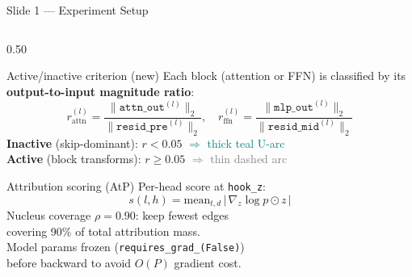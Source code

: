 \documentclass[aspectratio=169,10pt]{beamer}
\begin{document}
\begin{frame}{Slide 1 — Experiment Setup}
\begin{columns}[T]
\begin{column}{0.50\textwidth}
\begin{block}{Active/inactive criterion (new)}
\footnotesize
Each block (attention or FFN) is classified by its\\
\textbf{output-to-input magnitude ratio}:
\[
r_{\text{attn}}^{(l)} = \frac{\|\mathtt{attn\_out}^{(l)}\|_2}{\|\mathtt{resid\_pre}^{(l)}\|_2},
\quad
r_{\text{ffn}}^{(l)} = \frac{\|\mathtt{mlp\_out}^{(l)}\|_2}{\|\mathtt{resid\_mid}^{(l)}\|_2}
\]
\textbf{Inactive} (skip-dominant): $r < 0.05$ \quad
\textcolor{teal}{$\boldsymbol{\Rightarrow}$ thick teal U-arc}\\
\textbf{Active} (block transforms): $r \geq 0.05$ \quad
\textcolor{gray}{$\Rightarrow$ thin dashed arc}
\end{block}

\vspace{4pt}
\begin{block}{Attribution scoring (AtP)}
\footnotesize
Per-head score at \texttt{hook\_z}:
\[
s(l,h) = \textstyle\text{mean}_{t,d}\,|\,\nabla_z \log p \odot z\,|
\]
Nucleus coverage $\rho=0.90$: keep fewest edges\\
covering 90\% of total attribution mass.\\
Model params frozen (\texttt{requires\_grad\_(False)})\\
before backward to avoid $O(P)$ gradient cost.
\end{block}
\end{column}

\end{columns}
\end{frame}
\end{document}
